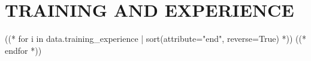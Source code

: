\section{TRAINING AND EXPERIENCE}

\begin{alignedentrieshang}
((* for i in data.training_experience | sort(attribute="end", reverse=True) *))
((* endfor *))
\end{alignedentrieshang}
